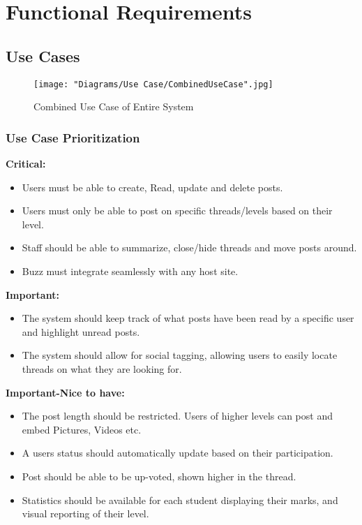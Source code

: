 \documentclass[12pt]{article}
\begin{document}
\section{Functional Requirements}

\subsection{Use Cases}
\begin{figure}[h]
	\centering
	\texttt{[image: "Diagrams/Use Case/CombinedUseCase".jpg]}
	\caption{Combined Use Case of Entire System}
\end{figure}
\clearpage

\subsubsection{Use Case Prioritization}
\textbf{Critical:}
\begin{itemize}
\item Users must be able to create, Read, update and delete posts.
\item Users must only be able to post on specific threads/levels based on their level.
\item Staff should be able to summarize, close/hide threads and move posts around.
\item Buzz must integrate seamlessly with any host site.
\end{itemize}
\textbf{Important:}
\begin{itemize}
\item The system should keep track of what posts have been read by a specific user and highlight unread posts.
\item The system should allow for social tagging, allowing users to easily locate threads on what they are looking for.
\end{itemize}
\textbf{Important-Nice to have:} 
\begin{itemize}
\item The post length should be restricted. Users of higher levels can post and embed Pictures, Videos etc.
\item A users status should automatically update based on their participation.
\item Post should be able to be up-voted, shown higher in the thread.
\item Statistics should be available for each student displaying their marks, and visual reporting of their level.
\end{itemize}
\end{document}
